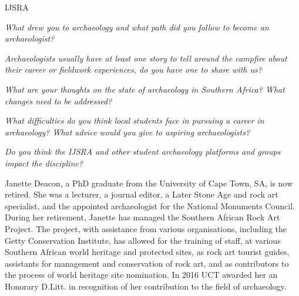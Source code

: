 \documentclass[%
	]{ijsra}
\begin{document}
\begin{labeling}{IJSRA}	
\item[IJSRA (International Journal of Student Research in Archaeology)] \emph{What drew you to archaeology and what path did you follow to become an archaeologist?}
	
\item[JD]


\item[IJSRA] \emph{Archaeologists usually have at least one story to tell around the campfire about their career or fieldwork experiences, do you have one to share with us?}
	
\item[JD]



\item[IJSRA] \emph{What are your thoughts on the state of archaeology in Southern Africa? What changes need to be addressed?}
	
\item[JD]


\item[IJSRA] \emph{What difficulties do you think local students face in pursuing a career in archaeology? What advice would you give to aspiring archaeologists?}
	
\item[JD]


\item[IJSRA] \emph{Do you think the IJSRA and other student archaeology platforms and groups impact the discipline?}
	
\item[JD]

\end{labeling}
\IJSRAseparator
{}
{\sffamily Janette Deacon, a PhD graduate from the University of Cape Town, SA, is now retired. She was a lecturer, a journal editor, a Later Stone Age and rock art specialist, and the appointed archaeologist for the National Monuments Council. During her retirement, Janette has managed the Southern African Rock Art Project. The project, with assistance from various organisations, including the Getty Conservation Institute, has allowed for the training of  staff, at various Southern African world heritage and protected sites, as rock art tourist guides, assistants for management and conservation of rock art, and as contributors to the process of world heritage site nomination. In 2016 UCT awarded her an Honorary D.Litt. in recognition of her contribution to the field of archaeology.}
\end{document}
